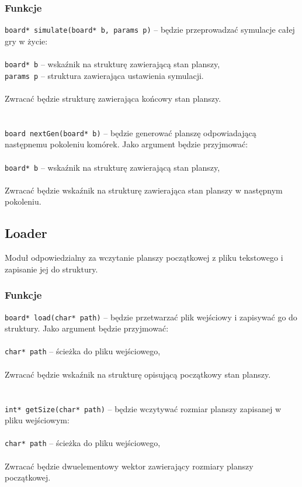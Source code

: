 \documentclass{article}
\begin{document}
\subsubsection{Funkcje}
\texttt{board* simulate(board* b, params p)} -- będzie przeprowadzać symulacje całej gry w życie:\\\\
	 \hspace*{10mm}\texttt{board* b} -- wskaźnik na strukturę zawierającą stan planszy,\\
	 \hspace*{10mm}\texttt{params p} -- struktura zawierająca ustawienia symulacji.\\
\\
Zwracać będzie strukturę zawierająca końcowy stan planszy.\\\\
\\
\texttt{board nextGen(board* b)} -- będzie generować planszę odpowiadającą następnemu pokoleniu komórek. Jako argument będzie przyjmować:\\\\
	 \hspace*{10mm}\texttt{board* b} -- wskaźnik na strukturę zawierającą stan planszy,\\
\\
Zwracać będzie wskaźnik na strukturę zawierająca stan planszy w następnym pokoleniu.

\subsection{Loader}
Moduł odpowiedzialny za wczytanie planszy początkowej z pliku tekstowego i zapisanie jej do struktury.

\subsubsection{Funkcje}
\texttt{board* load(char* path)} -- będzie przetwarzać plik wejściowy i zapisywać go do struktury. Jako argument będzie przyjmować:\\\\
	 \hspace*{10mm}\texttt{char* path} -- ścieżka do pliku wejściowego,\\
\\
Zwracać będzie wskaźnik na strukturę opisującą początkowy stan planszy.\\\\
\\
\texttt{int* getSize(char* path)} -- będzie wczytywać rozmiar planszy zapisanej w pliku wejściowym:\\\\ %
	 \hspace*{10mm}\texttt{char* path} -- ścieżka do pliku wejściowego,\\
\\
Zwracać będzie dwuelementowy wektor zawierający rozmiary planszy początkowej.
\end{document}
